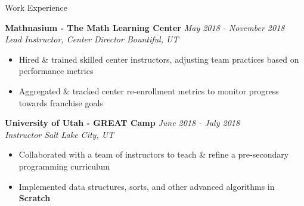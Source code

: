 \documentclass{resume} %
\begin{document}

\begin{rSection}{Work Experience}

{\bf Mathnasium - The Math Learning Center}
\hfill {\em May 2018 - November 2018}
\\{\em Lead Instructor, Center Director \hfill Bountiful, UT}
\vspace{-6pt}
\begin{itemize}[nosep]
    \item Hired \& trained skilled center instructors, adjusting team practices based on performance metrics
    \item Aggregated \& tracked center re-enrollment metrics to monitor progress towards franchise goals
\end{itemize}

{\bf University of Utah - GREAT Camp}
\hfill {\em June 2018 - July 2018}
\\{\em Instructor \hfill Salt Lake City, UT}
\vspace{-6pt}
\begin{itemize}[nosep]
    \item Collaborated with a team of instructors to teach \& refine a pre-secondary programming curriculum
    \item Implemented data structures, sorts, and other advanced algorithms in {\bf Scratch}
\end{itemize}

\end{rSection}
\end{document}
